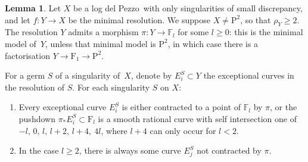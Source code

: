 \documentclass[11pt]{amsbook}
\theoremstyle{definition}
\theoremstyle{definition}
\theoremstyle{definition}
\theoremstyle{definition}
\theoremstyle{definition}
\newtheorem{lem}[thm]{Lemma}
\theoremstyle{definition}
\theoremstyle{definition}
\theoremstyle{definition}
\newcommand{\ldp}{log del Pezzo}
\newcommand{\mb}[1]{\mathbb{#1}}
\newcommand{\minres}{minimal resolution}
\newcommand{\F}{\mathrm{F}}
\renewcommand{\P}{\mathrm{P}}
\begin{document}
\begin{lem}\label{HSlem}
Let $X$ be a \ldp\ with only singularities of small discrepancy, and
let $f \colon Y \rightarrow X$ be the \minres. We suppose $X\not=\P^2$, so that $\rho_Y\ge2$.
The resolution $Y$ admits a morphism $\pi \colon Y \rightarrow \mathbb{F}_l$ for some $l\ge0$:
this is the minimal model of~$Y$, unless that minimal model
is $\P^2$, in which case there is a factorisation
$Y\rightarrow \F_1\rightarrow\P^2$.

For a germ $S$ of a singularity of~$X$, denote by
$E_i^S \subset Y$ the exceptional curves in the resolution of $S$.
For each singularity $S$ on $X$:
\begin{enumerate}
\item
Every exceptional curve $E_i^S$ is either contracted to a point of $\mb{F}_l$ by $\pi$,
or the pushdown
$\pi_* E_i^S\subset\F_l$ is a smooth rational curve with self intersection one of $-l, \,0, \, l, \, l+2, \, l+4,\ 4l $, where $l+4$ can only occur for $l<2$.
\item
In the case $l\ge2$, there is always some curve $E_j^S$ not contracted by $\pi$.
\end{enumerate}

\end{lem}
\end{document}
